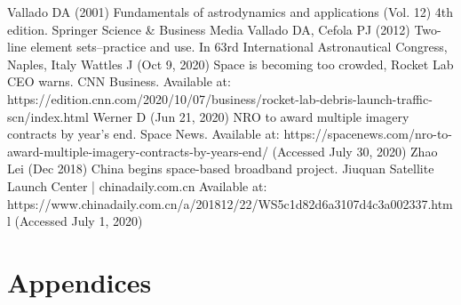 \documentclass[12pt,a4paper,notitlepage,twoside,openright]{report}
\begin{document}
\begin{thebibliography}{100}
 Vallado DA (2001) Fundamentals of astrodynamics and applications (Vol. 12) 4th edition. Springer Science \& Business Media
 Vallado DA, Cefola PJ (2012) Two-line element sets–practice and use. In 63rd International Astronautical Congress, Naples, Italy
 Wattles J (Oct 9, 2020) Space is becoming too crowded, Rocket Lab CEO warns. CNN Business. Available at: https://edition.cnn.com/2020/10/07/business/rocket-lab-debris-launch-traffic-scn/index.html
 Werner D (Jun 21, 2020) NRO to award multiple imagery contracts by year’s end. Space News. Available at: https://spacenews.com/nro-to-award-multiple-imagery-contracts-by-years-end/ (Accessed July 30, 2020)
 Zhao Lei (Dec 2018) China begins space-based broadband project. Jiuquan Satellite Launch Center | chinadaily.com.cn Available at: https://www.chinadaily.com.cn/a/201812/22/WS5c1d82d6a3107d4c3a002337.html (Accessed July 1, 2020)




\end{thebibliography}


\newpage
\chapter*{Appendices}
\label{app}
\end{document}
